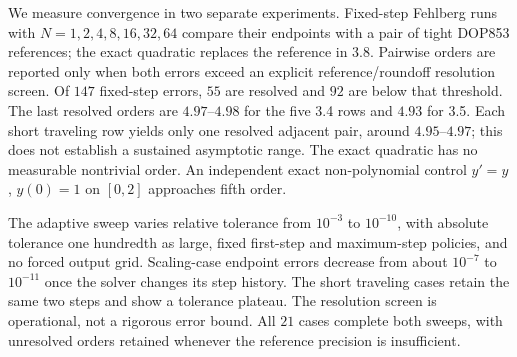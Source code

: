 \documentclass[11pt]{article}
\theoremstyle{definition}
\begin{document}
We measure convergence in two separate experiments.
Fixed-step Fehlberg runs with $N=1,2,4,8,16,32,64$ compare their endpoints
with a pair of tight DOP853 references; the exact quadratic replaces the
reference in 3.8. Pairwise orders are reported only when both errors exceed
an explicit reference/roundoff resolution screen. Of $147$ fixed-step errors,
$55$ are resolved and $92$ are below that threshold. The last resolved orders
are $4.97$--$4.98$ for the five 3.4 rows and $4.93$ for 3.5. Each short
traveling row yields only one resolved adjacent pair, around $4.95$--$4.97$;
this does not establish a sustained asymptotic range. The exact quadratic
has no measurable nontrivial order. An independent exact non-polynomial
control $y'=y$, $y(0)=1$ on $[0,2]$ approaches fifth order.

The adaptive sweep varies relative tolerance from $10^{-3}$ to $10^{-10}$,
with absolute tolerance one hundredth as large, fixed first-step and
maximum-step policies, and no forced output grid. Scaling-case endpoint
errors decrease from about $10^{-7}$ to $10^{-11}$ once the solver changes
its step history. The short traveling cases retain the same two steps and
show a tolerance plateau. The resolution screen is operational, not a
rigorous error bound. All $21$ cases complete both sweeps, with unresolved
orders retained whenever the reference precision is insufficient.
\end{document}
